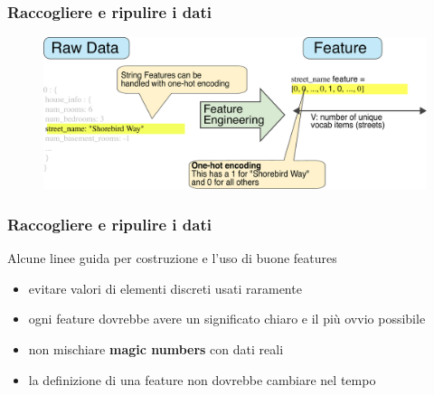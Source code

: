 \begin{frame}

	\frametitle{{\color{GradientDescentDiagramBlue}Raccogliere e ripulire i dati}}

	\begin{block}{}

		\begin{figure}[!htbp]
			\centering
			\includegraphics[width=1.0\linewidth]{images/data_prep/feature_engineering_and_data_cleaning/OneHotEncoding.pdf}
		\end{figure}

	\end{block}

\end{frame}


\begin{frame}

	\frametitle{{\color{GradientDescentDiagramBlue}Raccogliere e ripulire i dati}}

	\begin{block}{Alcune linee guida per costruzione e l'uso di buone features}
		\begin{itemize}
			\item evitare valori di elementi discreti usati raramente
			\item ogni feature dovrebbe avere un significato chiaro e il più ovvio possibile
			\item non mischiare \textbf{magic numbers} con dati reali
			\item la definizione di una feature non dovrebbe cambiare nel tempo
		\end{itemize}
	\end{block}

\end{frame}


